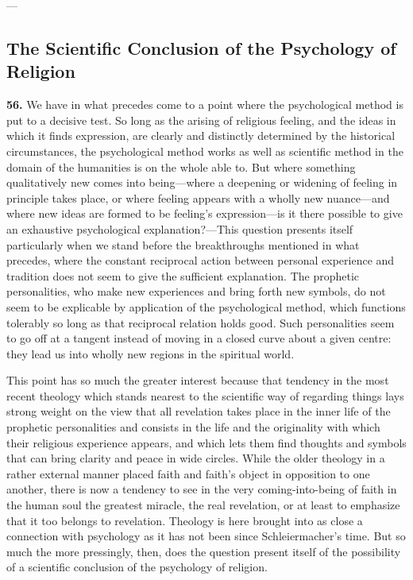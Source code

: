 \documentclass[12pt,a4paper]{book}
\newcommand{\opage}[1]{\marginnote{\footnotesize\textit{[#1]}}}
\begin{document}
\begin{center}---\end{center}

\subsection{The Scientific Conclusion of the Psychology of Religion}
\label{ssec:conclusion-psych}

\noindent\textbf{56.} We have in what precedes come to a point where the psychological
method is put to a decisive test. So long as the arising of religious feeling, and the
ideas in which it finds expression, are clearly and distinctly determined by the historical
circumstances, the psychological method works as well as scientific method in the domain of
the humanities is on the whole able to. But where something qualitatively new comes into
being---where a deepening or widening of feeling in principle takes place, or where feeling
appears with a wholly new nuance---and where new ideas are formed to be feeling's
expression---is it there possible to give an exhaustive psychological explanation?---This
question presents itself particularly when we stand before the breakthroughs mentioned in
what precedes, where the constant reciprocal action between personal experience and tradition
does not seem to give the sufficient explanation. The prophetic personalities, who make new
experiences and bring forth new symbols, do not seem to be explicable by application of the
psychological method, which functions tolerably so long as that reciprocal relation holds
good. Such personalities seem to go off at a tangent instead of moving in a closed curve
about a given centre: they lead us into wholly new regions in the spiritual world.

This point has so much the greater interest because that tendency in the most recent theology
which stands nearest to the scientific way of regarding things lays strong weight on the view
that all revelation takes place in the inner life of the prophetic personalities and consists
in the life and the originality with which their religious experience appears, and which lets
them find thoughts and symbols that can bring clarity and peace in wide circles. While the
older theology in a rather external manner placed faith and faith's object in opposition to one
another, there is now a tendency to see in the very coming-into-being of faith in the human
soul the greatest miracle, the real revelation, or at least 
\opage{127}to emphasize that it too belongs
to revelation. Theology is here brought into as close a connection with psychology as it has
not been since Schleiermacher's time. But so much the more pressingly, then, does the question
present itself of the possibility of a scientific conclusion of the psychology of religion.
\end{document}

